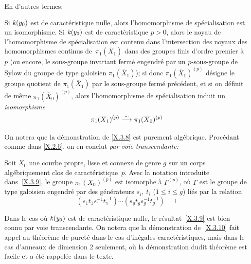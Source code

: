 En d'autres termes:

\begin{corollaire}
\label{X.3.9}
Si $\mathit{k}(y_0)$ est de caract\'eristique nulle, alors l'homomorphisme
de sp\'ecialisation est un isomorphisme. Si
$\mathit{k}(y_0)$ est de caract\'eristique $p>0$,
alors le noyau de
l'homomorphisme de sp\'ecialisation est contenu dans l'intersection
des noyaux des homomorphismes continus de~$\pi_1(\overline X_1)$ dans
des groupes finis d'ordre premier \`a~$p$ (ou encore, le sous-groupe
invariant ferm\'e engendr\'e par un $p$-sous-groupe de Sylow du
groupe de type galoisien $\pi_1(\overline X_1)$); si donc
$\pi_1(\overline X_1)^{(p)}$
d\'esigne le groupe quotient de
$\pi_1(\overline X_1)$ par le sous-groupe ferm\'e pr\'ec\'edent,
et si on d\'efinit de m\^eme $\pi_1(\overline X_0)^{(p)}$, alors
l'homomorphisme de sp\'ecialisation induit un \emph{isomorphisme}
$$
\pi_1(\overline X_1)^{(p)}\overset{\sim}{\longrightarrow} \pi_1(\overline X_0)^{(p)}
$$
\end{corollaire}

On notera que la d\'emonstration de \ref{X.3.8} est purement alg\'ebrique.
Proc\'edant comme dans \ref{X.2.6}, on en conclut \emph{par voie
transcendante:}

\begin{corollaire}
\label{X.3.10}
Soit $X_0$ une courbe propre, lisse et connexe de genre $g$ sur un
corps al\-g\'e\-bri\-quement clos de caract\'eristique~$p$. Avec
la notation introduite dans~\ref{X.3.9}, le groupe $\pi_1(X_0)^{(p)}$
est isomorphe \`a $\Gamma^{(p)}$, o\`u $\Gamma$ est le groupe de
type galoisien engendr\'e par des g\'en\'erateurs $s_i,~t_i$
($1\le i\le g$) li\'es par la relation
$$
(s_1t_1s_1^{-1}t_1^{-1})\cdots (s_gt_gs_g^{-1}t_g^{-1})=1
$$
\end{corollaire}

\begin{remarques}
\label{X.3.11}
Dans le cas o\`u $\mathit{k}(y_0)$ est de caract\'eristique nulle, le
r\'esultat~\ref{X.3.9} est bien connu par voie transcendante. On
notera que la d\'emonstration de~\ref{X.3.10} fait appel au
th\'eor\`eme de puret\'e dans le cas d'in\'egales
caract\'eristiques, mais dans le cas d'anneaux de dimension 2
seulement, o\`u la d\'emonstration dudit th\'eor\`eme est
facile et a \'et\'e rappel\'ee dans le texte.
\end{remarques}

